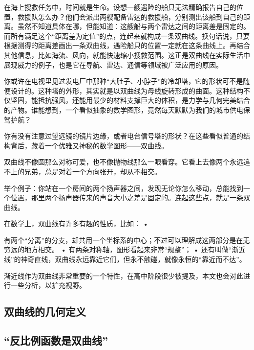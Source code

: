 
\begin{issues}
\issueDraft
\end{issues}


在海上搜救任务中，时间就是生命。设想一艘遇险的船只无法精确报告自己的位置，救援队怎么办？他们会派出两艘配备雷达的救援船，分别测出该船到自己的距离。虽然不知道具体在哪，但能知道：这艘船与两个雷达之间的距离差是固定的。而所有满足这个“距离差为定值”的点，连起来就构成一条双曲线。换句话说，只要根据测得的距离差画出一条双曲线，遇险船只的位置一定就在这条曲线上。再结合其他信息，比如海流、风向，就能快速缩小搜救范围。这正是双曲线在实际生活中展现威力的例子，也是它在导航、雷达、通信等领域被广泛应用的原因。

你或许在电视里见过发电厂中那种“大肚子、小脖子”的冷却塔，它的形状可不是随便设计的。这种塔的外形，其实就是以双曲线为母线旋转形成的曲面。这种结构不仅坚固，能抵抗强风，还能用最少的材料支撑巨大的体积，是力学与几何完美结合的产物。谁能想到，一个看似抽象的数学图形，竟然每天默默为我们的城市供电保驾护航？

你有没有注意过望远镜的镜片边缘，或者电台信号塔的形状？在这些看似普通的结构背后，藏着一个优雅又神秘的数学图形——双曲线。

双曲线不像圆那么对称可爱，也不像抛物线那么一眼看穿。它看上去像两个永远追不上的兄弟，总是对着一个方向张开，却从不相交。

举个例子：你站在一个房间的两个扬声器之间，发现无论你怎么移动，总能找到一个位置，那里两个扬声器传来的声音大小之差是固定的。连起这些点，就是一条双曲线。

在数学上，双曲线有许多有趣的性质，比如：
	•	

有两个“分离”的分支，却共用一个坐标系的中心；不过可以理解成这两部分是在无穷远的地方相交。
	•	有两条对称轴，图形看起来非常“规整”；
	•	还有叫做“渐近线”的神奇直线，双曲线永远靠近它们，但永不触碰，就像永恒的“靠近而不达”。


渐近线作为双曲线非常重要的一个特性，在高中阶段很少被提及，本文也会对此进行一些分析，以扩充视野。

\subsection{双曲线的几何定义}

\subsection{“反比例函数是双曲线”}

